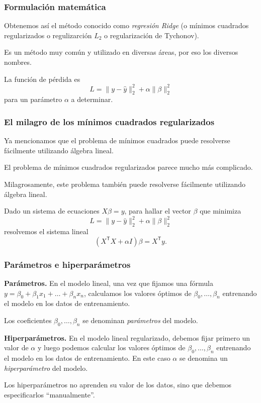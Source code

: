 \documentclass[aspectratio=169,12pt]{beamer}
\begin{document}
\begin{frame}
\frametitle{Formulación matemática}

Obtenemos así el método conocido como \emph{regresión Ridge} (o mínimos cuadrados regularizados o regulizarción $L_2$ o regularización de Tychonov). 

Es un método muy común y utilizado en diversas áreas, por eso los diversos nombres.

La función de pérdida es 
$$
L = \|y - \hat y\|_2^2 + \alpha \|\beta\|_2^2
$$
para un parámetro $\alpha$ a determinar.

\end{frame}

\begin{frame}
\frametitle{El milagro de los mínimos cuadrados regularizados}

Ya mencionamos que el problema de mínimos cuadrados puede resolverse fácilmente utilizando álgebra lineal.

El problema de mínimos cuadrados regularizados parece mucho más complicado.

Milagrosamente, este problema también puede resolverse fácilmente  utilizando álgebra lineal.

Dado un sistema de ecuaciones $X \beta = y$, para hallar el vector $\beta$ que minimiza 
$$L = \|y - \hat y\|_2^2 + \alpha \|\beta\|_2^2$$ 
resolvemos el sistema lineal
$$
\left(X^{\mathsf {T}}X+ \alpha I\right) \beta = X^{\mathsf {T}}{y}.
$$

\end{frame}

\begin{frame}
\frametitle{Parámetros e hiperparámetros}

\textbf{Parámetros.} En el modelo lineal, una vez que fijamos una fórmula $y = \beta_0 + \beta_1 x_1 + \dots + \beta_n x_n$, calculamos los valores óptimos de $\beta_0, \dots, \beta_n$ entrenando el modelo en los datos de entrenamiento.

Los coeficientes $\beta_0, \dots, \beta_n$ se denominan \emph{parámetros} del modelo.

\textbf{Hiperparámetros.} En el modelo lineal regularizado, debemos fijar primero un valor de $\alpha$ y luego podemos calcular los valores óptimos de $\beta_0, \dots, \beta_n$ entrenando el modelo en los datos de entrenamiento. En este caso $\alpha$ se denomina un \emph{hiperparámetro} del modelo.

Los hiperparámetros no aprenden su valor de los datos, sino que debemos especificarlos ``manualmente''.
\end{frame}
\end{document}
